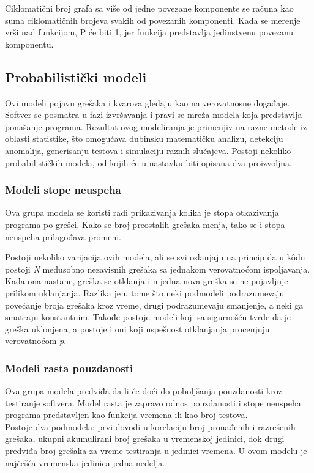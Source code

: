 \documentclass[a4paper]{article}
\begin{document}
Ciklomatični broj grafa sa više od jedne povezane komponente se računa kao suma ciklomatičnih brojeva svakih od povezanih komponenti. Kada se merenje vrši nad funkcijom,  P će biti 1, jer funkcija predstavlja jedinstvenu povezanu komponentu.\\

\subsection{Probabilistički modeli}
\label{sec:probabilisticki}

Ovi modeli pojavu grešaka i kvarova gledaju kao na verovatnosne događaje. Softver se posmatra u fazi izvršavanja i pravi se mreža modela koja predstavlja ponašanje programa. Rezultat ovog modeliranja je primenjiv na razne metode iz oblasti statistike, što omogućava dubinsku matematičku analizu, detekciju anomalija, generisanju testova i simulaciju raznih slučajeva. Postoji nekoliko probabilističkih modela, od kojih će u nastavku biti opisana dva proizvoljna. \\

\subsubsection{Modeli stope neuspeha}
\label{subsec:stopa_neuspeha}

Ova grupa modela se koristi radi prikazivanja kolika je stopa otkazivanja programa po grešci. Kako se broj preostalih grešaka menja, tako se i stopa neuspeha prilagođava promeni.

Postoji nekoliko varijacija ovih modela, ali se svi oslanjaju na princip da u k\^{o}du postoji \textit{N} međusobno nezavisnih grešaka sa jednakom verovatnoćom ispoljavanja. Kada ona nastane, greška se otklanja i nijedna nova greška se ne pojavljuje prilikom uklanjanja.
Razlika je u tome što neki podmodeli podrazumevaju povećanje broja grešaka kroz vreme, drugi podrazumevaju smanjenje, a neki ga smatraju konstantnim. Takođe postoje modeli koji sa sigurnošću tvrde da je greška uklonjena, a postoje i oni koji uspešnost otklanjanja procenjuju verovatnoćom \textit{p}.

\subsubsection{Modeli rasta pouzdanosti}
\label{subsec:rast_pouzdanosti}

Ova grupa modela predviđa da li će doći do poboljšanja pouzdanosti kroz testiranje softvera. Model rasta je zapravo odnos pouzdanosti i stope neuspeha programa predstavljen kao funkcija vremena ili kao broj testova.\\
Postoje dva podmodela: prvi dovodi u korelaciju broj pronađenih i razrešenih grešaka, ukupni akumulirani broj grešaka u vremenskoj jedinici, dok drugi predviđa broj grešaka za vreme testiranja u jedinici vremena. U ovom modelu je najčešća vremenska jedinica jedna nedelja.
\end{document}

